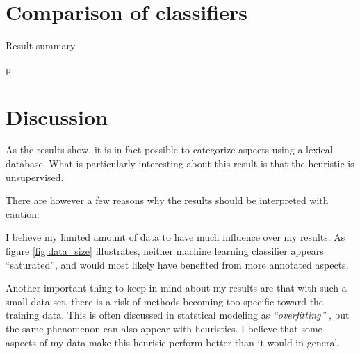 \documentclass[a4paper,11pt]{kth-mag}
\begin{document}
\section{Comparison of classifiers}
\label{sec:comparison}

\begin{table}[h]
  \centering

  \vspace{0.4cm}\caption{Result summary}
  \label{general_asp}
p\end{table}


\section{Discussion}
As the results show, it is in fact possible to categorize aspects using a lexical database. What is particularly interesting about this result is that the heuristic is unsupervised.

There are however a few reasons why the results should be interpreted with caution:

I believe my limited amount of data to have much influence over my results. As figure \ref{fig:data_size} illustrates, neither machine learning classifier appears ``saturated'', and would most likely have benefited from more annotated aspects.

Another important thing to keep in mind about my results are that with such a small data-set, there is a risk of methods becoming too specific toward the training data. This is often discussed in statstical modeling as \emph{``overfitting'' }, but the same phenomenon can also appear with heuristics. I believe that some aspects of my data make this heurisic perform better than it would in general.








\end{document}
